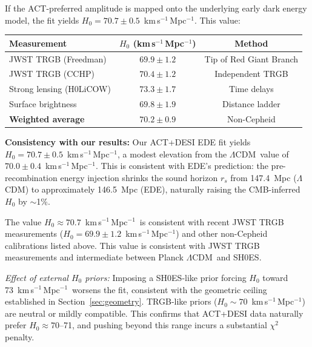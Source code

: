 \documentclass[twocolumn,showpacs,preprintnumbers,amsmath,amssymb,prd]{revtex4-2}
\newcommand{\lcdm}{$\Lambda$CDM}
\newcommand{\kms}{km\,s$^{-1}$\,Mpc$^{-1}$}
\begin{document}
If the ACT-preferred amplitude is mapped onto the underlying early dark 
energy model, the fit yields $H_0 = 70.7 \pm 0.5$~\kms. This value:
\begin{center}
\begin{tabular}{lcc}
\toprule
Measurement & $H_0$ (\kms) & Method \\
\midrule
JWST TRGB (Freedman) & $69.9 \pm 1.2$ & Tip of Red Giant Branch \\
JWST TRGB (CCHP) & $70.4 \pm 1.2$ & Independent TRGB \\
Strong lensing (H0LiCOW) & $73.3 \pm 1.7$ & Time delays \\
Surface brightness & $69.8 \pm 1.9$ & Distance ladder \\
\midrule
\textbf{Weighted average} & $\mathbf{70.2 \pm 0.9}$ & Non-Cepheid \\
\bottomrule
\end{tabular}
\end{center}

\textbf{Consistency with our results:} Our ACT+DESI EDE fit yields 
$H_0 = 70.7 \pm 0.5$~\kms, a modest elevation from the \lcdm\ value of 
$70.0 \pm 0.4$~\kms. This is consistent with EDE's prediction: the 
pre-recombination energy injection shrinks the sound horizon 
$r_s$ from 147.4~Mpc (\lcdm) to approximately 146.5~Mpc (EDE), 
naturally raising the CMB-inferred $H_0$ by $\sim$1\%.

The value $H_0 \approx 70.7$~\kms\ is consistent with recent 
JWST TRGB measurements ($H_0 = 69.9 \pm 1.2$~\kms) and other non-Cepheid 
calibrations listed above. This value is consistent with JWST TRGB measurements and intermediate 
between Planck \lcdm\ and SH0ES.

\emph{Effect of external $H_0$ priors:} Imposing a SH0ES-like prior forcing 
$H_0$ toward 73~\kms\ worsens the fit, consistent with the geometric ceiling 
established in Section~\ref{sec:geometry}. TRGB-like priors ($H_0 \sim 70$~\kms) 
are neutral or mildly compatible. This confirms that ACT+DESI data naturally prefer $H_0 \approx 70$--71, 
and pushing beyond this range incurs a substantial $\chi^2$ penalty.
\end{document}
